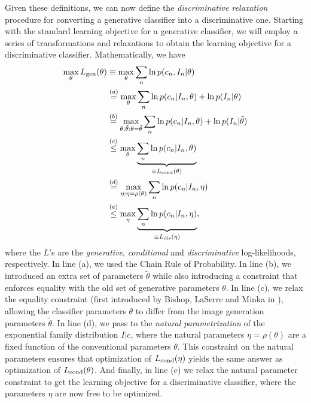 \documentclass[12pt]{article}
\begin{document}
Given these definitions, we can now define the \emph{discriminative relaxation} procedure for converting a generative classifier into a discriminative one. Starting with the standard learning objective for a generative classifier, we will employ a series of transformations and relaxations to obtain the learning objective for a discriminative classifier. Mathematically, we have
\begin{align} 
	\max_{\theta} L_{\rm gen}(\theta) 
	&\equiv \max_{\theta} \sum_{n} \ln p(c_{n}, I_{n} | \theta)
	\nonumber\\ 
	&\overset{(a)}{=} \max_{\theta} \sum_{n} \ln p(c_{n} | I_{n}, \theta) + \ln p(I_{n} | \theta)
	\nonumber\\ 
	&\overset{(b)}{=} \max_{\theta, \tilde{\theta}: \theta = \tilde{\theta} } \sum_{n} \ln p(c_{n} | I_{n}, \theta) + \ln p(I_{n} | \tilde{\theta})
	\nonumber\\ 
	&\overset{(c)}{\leq} \max_{\theta} \underbrace{\sum_{n} \ln p(c_{n} | I_{n}, \theta)}_{\equiv L_{\rm cond}(\theta)}
	\nonumber\\ 
	&\overset{(d)}{=} \max_{\eta : \eta = \rho(\theta)} \sum_{n} \ln p(c_{n} | I_{n}, \eta)
	\nonumber\\ 
	&\overset{(e)}{\leq} \max_{\eta} \underbrace{\sum_{n} \ln p(c_{n} | I_{n}, \eta)}_{\equiv L_{\rm dis}(\eta)},
	\label{eqn:like-gen-cond-discr}
\end{align}
where the $L$'s are the \emph{generative}, \emph{conditional} and \emph{discriminative} log-likelihoods, respectively. In line (a), we used the Chain Rule of Probability. In line (b), we introduced an extra set of parameters $\tilde{\theta}$ while also introducing a constraint that enforces equality with the old set of generative parameters $\theta$. In line (c), we relax the equality constraint (first introduced by Bishop, LaSerre and Minka in \cite{bishop2007generative}), allowing the classifier parameters $\theta$ to differ from the image generation parameters $\tilde{\theta}$. In line (d), we pass to the \emph{natural parametrization} of the exponential family distribution $I | c$, where the natural parameters $\eta = \rho(\theta)$ are a fixed function of the conventional parameters $\theta$. This constraint on the natural parameters ensures that optimization of $L_{\rm cond}(\eta)$ yields the same answer as optimization of $L_{\rm cond}(\theta)$. And finally, in line (e) we relax the natural parameter constraint to get the learning objective for a discriminative classifier, where the parameters $\eta$ are now free to be optimized. 
\end{document}
